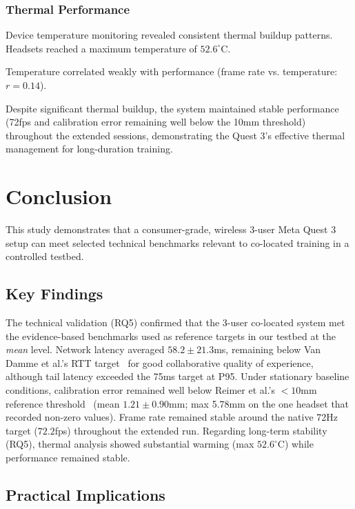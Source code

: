 \documentclass[conference]{IEEEtran}
\begin{document}
\subsubsection{Thermal Performance}

Device temperature monitoring revealed consistent thermal buildup patterns. Headsets reached a maximum temperature of $52.6^{\circ}$C.

Temperature correlated weakly with performance (frame rate vs. temperature: $r=0.14$).

Despite significant thermal buildup, the system maintained stable performance (72fps and calibration error remaining well below the 10mm threshold) throughout the extended sessions, demonstrating the Quest 3's effective thermal management for long-duration training.


\section{Conclusion}

This study demonstrates that a consumer-grade, wireless 3-user Meta Quest 3 setup can meet selected technical benchmarks relevant to co-located training in a controlled testbed.

\subsection{Key Findings}

The technical validation (RQ5) confirmed that the 3-user co-located system met the evidence-based benchmarks used as reference targets in our testbed at the \emph{mean} level. Network latency averaged $58.2 \pm 21.3$ms, remaining below Van Damme et al.'s RTT target~\cite{VanDammeSam2024Iolo} for good collaborative quality of experience, although tail latency exceeded the 75ms target at P95. Under stationary baseline conditions, calibration error remained well below Reimer et al.'s $<10$mm reference threshold~\cite{ReimerDennis2021CfSV} (mean $1.21 \pm 0.90$mm; max 5.78mm on the one headset that recorded non-zero values). Frame rate remained stable around the native 72Hz target ($72.2$fps) throughout the extended run. Regarding long-term stability (RQ5), thermal analysis showed substantial warming (max $52.6^{\circ}$C) while performance remained stable.

\subsection{Practical Implications}
\end{document}

